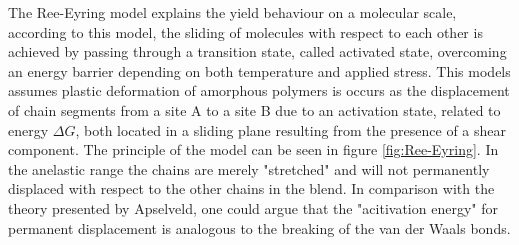 The Ree-Eyring model explains the yield behaviour on a molecular scale, according to this model, the sliding of molecules with respect to each other is achieved by passing through a transition state, called activated state, overcoming an energy barrier depending on both temperature and applied stress. This models assumes plastic deformation of amorphous polymers is occurs as the displacement of chain segments from a site A to a site B due to an activation state, related to energy $\Delta G$, both located in a sliding plane resulting from the presence of a shear component. The principle of the model can be seen in figure \ref{fig:Ree-Eyring}. In the anelastic range the chains are merely "stretched" and will not permanently displaced with respect to the other chains in the blend. In comparison with the theory presented by Apselveld, one could argue that the "acitivation energy" for permanent displacement is analogous to the breaking of the van der Waals bonds.

